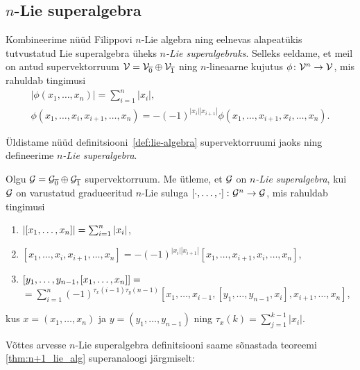 \subsection{\texorpdfstring{$n$}\ -Lie superalgebra}

Kombineerime nüüd Filippovi $n$-Lie algebra ning eelnevas alapeatükis
tutvustatud Lie superalgebra üheks \emph{$n$-Lie superalgebraks}. Selleks
eeldame, et meil on antud supervektorruum 
$\mathcal{V} = \mathcal{V}_{\overline{0}} \oplus \mathcal{V}_{\overline{1}}$
ning $n$-lineaarne kujutus $\phi \colon \mathcal{V}^n \to \mathcal{V}$, mis rahuldab
tingimusi
\begin{gather}
    |\phi(x_1, \dots, x_n)| = \sum_{i=1}^n |x_i|, \\
    \phi \left( x_1, \dots, x_i, x_{i+1}, \dots, x_n \right) =
        -(-1)^{ |x_i| |x_{i+1}| } \phi \left(
            x_1, \dots, x_{i+1}, x_i, \dots, x_n
        \right).
\end{gather}

Üldistame nüüd definitsiooni~\ref{def:lie-algebra} supervektorruumi jaoks
ning defineerime \emph{$n$-Lie superalgebra}.

\begin{dfn}
    Olgu $\mathcal{G} = \mathcal{G}_{\overline{0}} \oplus \mathcal{G}_{\overline{1}}$ 
    supervektorruum. Me ütleme, et $\mathcal{G}$ on
    \emph{$n$-Lie superalgebra}, kui $\mathcal{G}$ on varustatud
    gradueeritud $n$-Lie suluga $\left[ \cdot, \dots, \cdot \right] \colon \mathcal{G}^n \to \mathcal{G}$,
    mis rahuldab tingimusi
    \begin{enumerate}
        \item $\left| \left[ x_1, \dots, x_n \right] \right| = \sum_{i=1}^n |x_i| $,
        \item $\left[ x_1, \dots, x_i, x_{i+1}, \dots, x_n \right] =
            -(-1)^{|x_i| |x_{i+1}|} \left[
                x_1, \dots, x_{i+1}, x_i, \dots, x_n
            \right]$,
        \item $\left[ y_1, \dots, y_{n-1}, \left[ x_1, \dots, x_n \right] \right] = $ \\
            $ = \sum_{i=1}^n (-1)^{\tau_x (i-1) \tau_y (n-1)}
            \left[
                x_1, \dots, x_{i-1},
                \left[ y_1, \dots, y_{n-1}, x_i \right],
                x_{i+1}, \dots, x_n
            \right] $,
    \end{enumerate}
    kus $x = (x_1, \dots, x_n)$ ja $y = (y_1, \dots, y_{n-1})$ ning
    $\tau_x (k) = \sum_{j=1}^{k-1} |x_i|$.
\end{dfn}

Võttes arvesse $n$-Lie superalgebra definitsiooni saame sõnastada 
teoreemi \ref{thm:n+1_lie_alg} superanaloogi järgmiselt:

